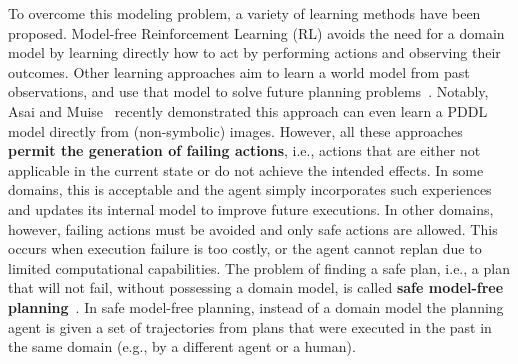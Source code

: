 \documentclass{article}
\begin{document}
To overcome this modeling problem, a variety of learning methods have been proposed. 
Model-free Reinforcement Learning (RL)
avoids the need for a domain model by learning directly how to act by performing actions and observing their outcomes. 
Other learning approaches aim to learn a world model from past observations, and use that model to solve future planning problems~\cite{amir2008}. Notably, Asai and Muise~ recently demonstrated this approach can even learn a PDDL model directly from (non-symbolic) images. 
However, all these approaches \textbf{permit the generation of failing actions}, i.e., actions that are either not applicable in the current state or do not achieve the intended effects.  %
In some domains, this is acceptable and the agent simply incorporates such experiences and updates its internal model to improve future executions. 
In other domains, however, failing actions must be avoided and only safe actions are allowed.  
This occurs when execution failure is too costly, or the agent cannot replan due to limited computational capabilities.
The problem of finding a safe plan, i.e., a plan that will not fail, without possessing a domain model, is called \textbf{safe model-free planning}~\cite{stern2017efficientAndSafe}. 
In safe model-free planning, instead of a domain model the planning agent is given a set of trajectories from plans that were executed in the past in the same domain (e.g., by a different agent or a human). 
\end{document}
